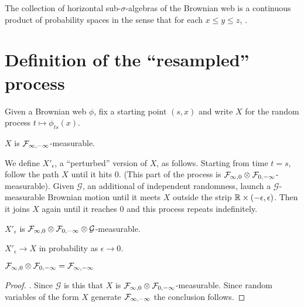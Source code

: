 {\begin{theorem}
  The collection of horizontal sub-$\sigma$-algebras of the Brownian
  web is a continuous product of probability spaces in the sense that
  for each $x \le y \le z$,  .
\end{theorem}

\section{Definition of the ``resampled'' process}

\newcommand{\sampled}{X}
\newcommand{\resamplede}{X'_{\epsilon}}
\newcommand{\reservoir}{\mathcal{G}}

\newcommand{\twostrips}{\commafactor{\infty}{0} \tensor \commafactor{0}{-\infty}}
\newcommand{\onestrip}{\commafactor{\infty}{-\infty}}
\newcommand{\twostripsreservoir}{\twostrips \tensor \reservoir}

\begin{definition}
Given a Brownian web $\phi$, fix a starting point $(s,x)$ and write
$\sampled$ for the random process $t \mapsto \phi_{ts}(x)$.
\end{definition}

\begin{obs}
  $\sampled$ is $\onestrip$-measurable.
\end{obs}

\begin{definition}
  We define $\resamplede$, a ``perturbed'' version of $\sampled$, as
  follows.  Starting from time $t = s$, follow the path $\sampled$
  until it hits $0$.  (This part of the process is
  $\twostrips$-measurable).  Given $\reservoir$, an additional
   of independent
  randomness, launch a $\reservoir$-measurable Brownian motion until
  it meets $\sampled$ outside the strip $\mathbb{R} \times (-\epsilon,
  \epsilon)$.  Then it joins $\sampled$ again until it reaches $0$ and
  this process repeats indefinitely.
\end{definition}

\begin{obs}
  $\resamplede$ is $\twostripsreservoir$-measurable.
\end{obs}

\begin{lemma}
  $\resamplede \to \sampled$ in probability as $\epsilon \to 0$.
\end{lemma}

\begin{theorem}
  $\twostrips = \onestrip$
\end{theorem}

\begin{proof}
  \FIXME{$\sampled$ is $\twostripsreservoir$-measurable}{say why}.
  Since $\reservoir$ is
 this  that $\sampled$ is $\twostrips$-measurable.
Since random variables of the form $\sampled$ generate
$\onestrip$ the conclusion follows.
\end{proof}
}
